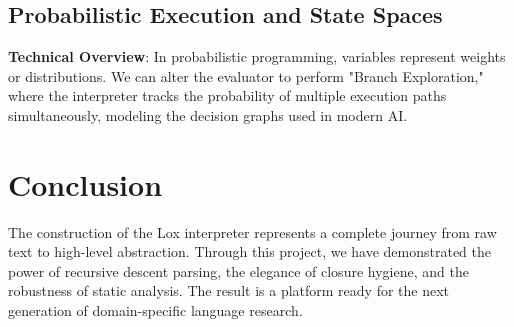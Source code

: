\documentclass[12pt,a4paper,oneside]{report}
\begin{document}
\section{Probabilistic Execution and State Spaces}
\textbf{Technical Overview}: In probabilistic programming, variables represent weights or distributions. We can alter the evaluator to perform "Branch Exploration," where the interpreter tracks the probability of multiple execution paths simultaneously, modeling the decision graphs used in modern AI.

\chapter{Conclusion}
The construction of the Lox interpreter represents a complete journey from raw text to high-level abstraction. Through this project, we have demonstrated the power of recursive descent parsing, the elegance of closure hygiene, and the robustness of static analysis. The result is a platform ready for the next generation of domain-specific language research.
\end{document}
